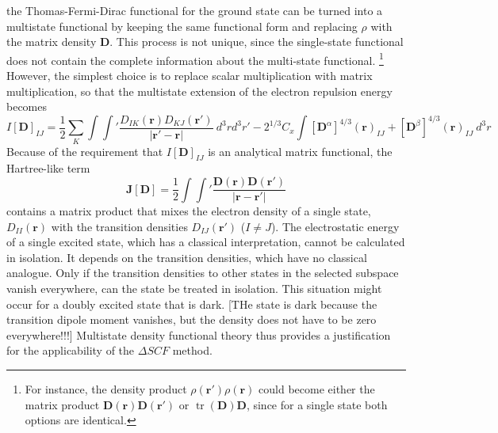 \documentclass[journal=jacsat,manuscript=article]{achemso}
\DeclareMathOperator{\tr}{tr}
\newcommand\m[1]{\mathbf{#1}}
\renewcommand\vec[1]{\mathbf{#1}}
\begin{document}
the Thomas-Fermi-Dirac functional for the ground state can be turned into a multistate functional by keeping the same functional form
and replacing $\rho$ with the matrix density $\m{D}$. This process is not unique, since the single-state
functional does not contain the complete information about the multi-state functional.
\footnote{For instance, the density product $\rho(\vec{r}') \rho(\vec{r})$ could become either the matrix product $\m{D}(\vec{r}) \m{D}(\vec{r}')$
or $\tr(\m{D}) \m{D}$, since for a single state both options are identical.}
However, the simplest choice is to replace scalar multiplication with matrix multiplication, so that the multistate extension
of the electron repulsion energy becomes
\begin{equation}
I[\m{D}]_{IJ} = 
\frac{1}{2} \sum_{K} \int \int' \frac{D_{IK}(\vec{r}) D_{KJ}(\vec{r}')}{\vert \vec{r}' - \vec{r} \vert} ~ d^3r d^3r'
- 2^{1/3} C_x \int [\m{D}^{\alpha}]^{4/3}(\vec{r})_{IJ} + [\m{D}^{\beta}]^{4/3}(\vec{r})_{IJ} ~ d^3r
\end{equation}
Because of the requirement that $I[\m{D}]_{IJ}$ is an analytical matrix functional, the Hartree-like term 
\begin{equation}
\m{J}[\m{D}] = \frac{1}{2} \int \int' \frac{\m{D}(\vec{r}) \m{D}(\vec{r}')}{\vert \vec{r} - \vec{r}' \vert} \label{eqn:Hartree_term}
\end{equation}
contains a matrix product that mixes the electron density of a single state,
$D_{II}(\vec{r})$ with the transition densities $D_{IJ}(\vec{r}')$ ($I \neq J$).
The electrostatic energy of a single excited state, which has a classical interpretation, cannot be calculated in
isolation. It depends on the transition densities, which have no classical analogue.
Only if the transition densities to other states in the selected subspace vanish everywhere, can the state be
treated in isolation. This situation might occur for a doubly excited state that is dark. [THe state is dark because the transition dipole moment
vanishes, but the density does not have to be zero everywhere!!!]
Multistate density functional theory thus provides a justification for the applicability of the $\Delta SCF$ method.
\end{document}
